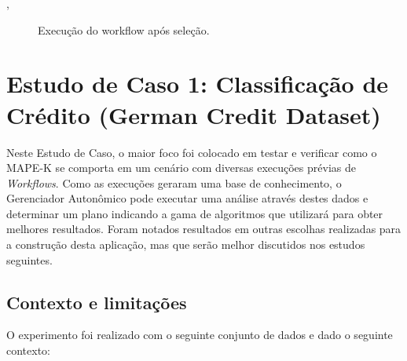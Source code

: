 \documentclass[portugues]{ic-tese}
\begin{document}
,
\begin{figure}[H]
    \centering
    \caption{Execução do workflow após seleção.}
    \label{fig:pipelineAutonomoResultado}
\end{figure}

\chapter{Estudo de Caso 1: Classificação de Crédito (German Credit Dataset)}

Neste Estudo de Caso, o maior foco foi colocado em testar e verificar como o \mbox{MAPE-K} se comporta em um cenário com diversas execuções prévias de \textit{Workflows}. Como as execuções geraram uma base de conhecimento, o Gerenciador Autonômico pode executar uma análise através destes dados e determinar um plano indicando a gama de algoritmos que utilizará para obter melhores resultados. Foram notados resultados em outras escolhas realizadas para a construção desta aplicação, mas que serão melhor discutidos nos estudos seguintes.

\section{Contexto e limitações}

O experimento foi realizado com o seguinte conjunto de dados e dado o seguinte contexto:
\end{document}
